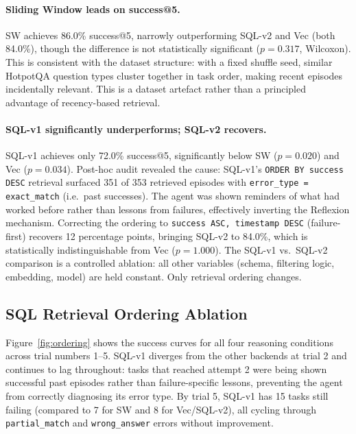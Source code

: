 \documentclass{article}
\begin{document}
\paragraph{Sliding Window leads on success@5.}
SW achieves 86.0\% success@5, narrowly outperforming SQL-v2 and Vec (both
84.0\%), though the difference is not statistically significant
($p = 0.317$, Wilcoxon). This is consistent with the dataset structure:
with a fixed shuffle seed, similar HotpotQA question types cluster together
in task order, making recent episodes incidentally relevant. This is a
dataset artefact rather than a principled advantage of recency-based
retrieval.

\paragraph{SQL-v1 significantly underperforms; SQL-v2 recovers.}
SQL-v1 achieves only 72.0\% success@5, significantly below SW ($p = 0.020$)
and Vec ($p = 0.034$). Post-hoc audit revealed the cause: SQL-v1's
\texttt{ORDER BY success DESC} retrieval surfaced 351 of 353 retrieved
episodes with \texttt{error\_type = exact\_match} (i.e.\ past successes).
The agent was shown reminders of what had worked before rather than lessons
from failures, effectively inverting the Reflexion mechanism. Correcting
the ordering to \texttt{success ASC, timestamp DESC} (failure-first)
recovers 12 percentage points, bringing SQL-v2 to 84.0\%, which is
statistically indistinguishable from Vec ($p = 1.000$). The SQL-v1
vs.\ SQL-v2 comparison is a controlled ablation: all other variables
(schema, filtering logic, embedding, model) are held constant. Only
retrieval ordering changes.

\subsection{SQL Retrieval Ordering Ablation}
\label{sec:ordering}

Figure~\ref{fig:ordering} shows the success curves for all four reasoning
conditions across trial numbers 1--5. SQL-v1 diverges from the other
backends at trial 2 and continues to lag throughout: tasks that reached
attempt 2 were being shown successful past episodes rather than
failure-specific lessons, preventing the agent from correctly diagnosing
its error type. By trial 5, SQL-v1 has 15 tasks still failing (compared
to 7 for SW and 8 for Vec/SQL-v2), all cycling through
\texttt{partial\_match} and \texttt{wrong\_answer} errors without
improvement.
\end{document}
